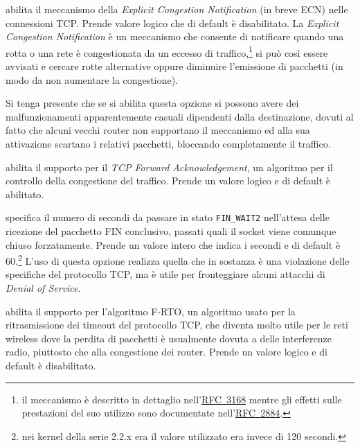 \begin{basedescript}{\desclabelwidth{2.2cm}\desclabelstyle{\nextlinelabel}}
\item[\sysctlrelfiled{net/ipv4}{tcp\_ecn}] abilita il meccanismo della
  \textit{Explicit Congestion Notification} (in breve ECN) nelle connessioni
  TCP. Prende valore logico che di default è disabilitato. La \textit{Explicit
    Congestion Notification} 
  è un meccanismo che consente di notificare quando una rotta o una rete è
  congestionata da un eccesso di traffico,\footnote{il meccanismo è descritto
    in dettaglio nell'\href{http://www.ietf.org/rfc/rfc3168.txt}{RFC~3168}
    mentre gli effetti sulle prestazioni del suo utilizzo sono documentate
    nell'\href{http://www.ietf.org/rfc/rfc2884.txt}{RFC~2884}.} si può così
  essere avvisati e cercare rotte alternative oppure diminuire l'emissione di
  pacchetti (in modo da non aumentare la congestione).

  Si tenga presente che se si abilita questa opzione si possono avere dei
  malfunzionamenti apparentemente casuali dipendenti dalla destinazione,
  dovuti al fatto che alcuni vecchi router non supportano il meccanismo ed
  alla sua attivazione scartano i relativi pacchetti, bloccando completamente
  il traffico.


\item[\sysctlrelfiled{net/ipv4}{tcp\_fack}] abilita il supporto per il
  \textit{TCP Forward Acknowledgement}, un algoritmo per il controllo della
  congestione del traffico. Prende un valore logico e di default è abilitato.


\item[\sysctlrelfiled{net/ipv4}{tcp\_fin\_timeout}] specifica il numero di
  secondi da passare in stato \texttt{FIN\_WAIT2} nell'attesa delle ricezione
  del pacchetto FIN conclusivo, passati quali il socket viene comunque chiuso
  forzatamente.  Prende un valore intero che indica i secondi e di default è
  60.\footnote{nei kernel della serie 2.2.x era il valore utilizzato era
    invece di 120 secondi.} L'uso di questa opzione realizza quella che in
  sostanza è una violazione delle specifiche del protocollo TCP, ma è utile
  per fronteggiare alcuni attacchi di \textit{Denial of Service}.

\item[\sysctlrelfiled{net/ipv4}{tcp\_frto}] abilita il supporto per
  l'algoritmo F-RTO, un algoritmo usato per la ritrasmissione dei timeout del
  protocollo TCP, che diventa molto utile per le reti wireless dove la perdita
  di pacchetti è usualmente dovuta a delle interferenze radio, piuttosto che
  alla congestione dei router. Prende un valore logico e di default è
  disabilitato.


\end{basedescript}
